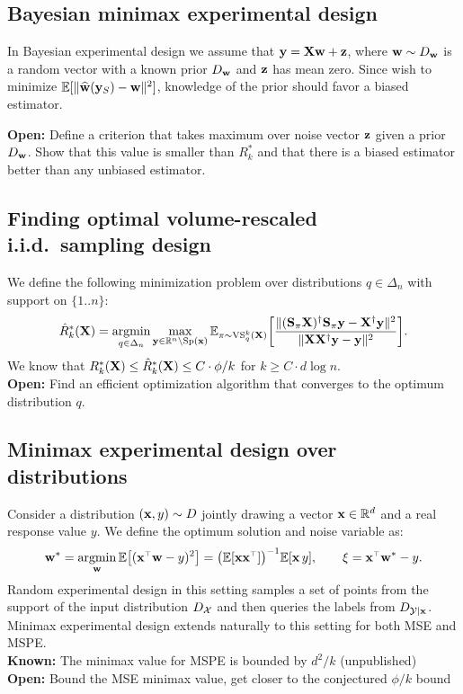\documentclass[12pt]{../sty/colt2019/colt2018-arxiv}
\begin{document}
\subsection{Bayesian minimax experimental design}
In Bayesian experimental design we assume that $\mathbf y=\mathbf X\mathbf w+\mathbf z$, where $\mathbf w\sim D_\mathbf w$  is a random vector with a known prior $D_\mathbf w$ and $\mathbf z$ has mean zero. Since wish to minimize $\mathbb E[\|\widehat{\mathbf w}(\mathbf y_S)-\mathbf w\|^2]$, knowledge of the prior should favor a biased estimator.

\textbf{Open:} Define a criterion that takes maximum over noise vector $\mathbf z$ given a prior $D_\mathbf w$. Show that this value is smaller than $R_k^*$ and that there is a biased estimator better than any unbiased estimator.

\subsection{Finding optimal volume-rescaled i.i.d.~sampling design}
We define the following minimization problem over distributions $q\in\Delta_n$ with support on $\{1..n\}$:
\begin{align*}
  \hat{R}_k^*(\mathbf X) = \operatorname*{\mathop{\mathrm{argmin}}}_{q\in\Delta_n}\max_{\mathbf y\in\mathbb R^n\backslash\mathrm{Sp}(\mathbf x)}
  \mathbb E_{\pi\sim{\mathrm{VS}}_q^k(\mathbf X)}\bigg[\frac{\|(\mathbf{S}_\pi\mathbf X)^\dagger\mathbf{S}_\pi\mathbf y - \mathbf X^\dagger\mathbf y\|^2}{\|\mathbf X\mathbf X^\dagger\mathbf y-\mathbf y\|^2}\bigg].
\end{align*}
We know that $R_k^*(\mathbf X)\leq \hat{R}_k^*(\mathbf X)\leq C\cdot \phi/k$ for $k\geq C\cdot d\log n$.\\
\textbf{Open:} Find an efficient optimization algorithm that converges to the optimum distribution $q$.
\subsection{Minimax experimental design over distributions}
Consider a distribution $(\mathbf x,y)\sim D$ jointly drawing a vector $\mathbf x\in\mathbb R^d$ and a real response value $y$. We define the optimum solution  and noise variable as:
\begin{align*}
  \w^*=\argmin_\w\E\big[(\x^\top\w-y)^2\big] = \big(\E[\x\x^\top]\big)^{-1}\E[\x\,y],\qquad \xi = \x^\top\w^*-y.
\end{align*}
Random experimental design in this setting samples a set of points from the support of the input distribution $D_{\cal X}$ and then queries the labels from $D_{\cal Y|\mathbf x}$. Minimax experimental design extends naturally to this setting for both MSE and MSPE.\\
\textbf{Known:} The minimax value for MSPE is bounded by $d^2/k$ (unpublished)\\
\textbf{Open:} Bound the MSE minimax value, get closer to the conjectured $\phi/k$ bound
\end{document}
